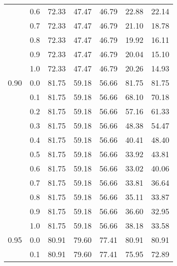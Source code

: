 \begin{longtable}{lp{2cm}|p{2cm}p{2cm}p{2cm}p{2cm}p{2cm}}
     & 0.6 &       72.33 &             47.47 &                46.79 &                22.88 &           22.14 \\
     & 0.7 &       72.33 &             47.47 &                46.79 &                21.10 &           18.78 \\
     & 0.8 &       72.33 &             47.47 &                46.79 &                19.92 &           16.11 \\
     & 0.9 &       72.33 &             47.47 &                46.79 &                20.04 &           15.10 \\
     & 1.0 &       72.33 &             47.47 &                46.79 &                20.26 &           14.93 \\
0.90 & 0.0 &       81.75 &             59.18 &                56.66 &                81.75 &           81.75 \\
     & 0.1 &       81.75 &             59.18 &                56.66 &                68.10 &           70.18 \\
     & 0.2 &       81.75 &             59.18 &                56.66 &                57.16 &           61.33 \\
     & 0.3 &       81.75 &             59.18 &                56.66 &                48.38 &           54.47 \\
     & 0.4 &       81.75 &             59.18 &                56.66 &                40.41 &           48.40 \\
     & 0.5 &       81.75 &             59.18 &                56.66 &                33.92 &           43.81 \\
     & 0.6 &       81.75 &             59.18 &                56.66 &                33.02 &           40.06 \\
     & 0.7 &       81.75 &             59.18 &                56.66 &                33.81 &           36.64 \\
     & 0.8 &       81.75 &             59.18 &                56.66 &                35.11 &           33.87 \\
     & 0.9 &       81.75 &             59.18 &                56.66 &                36.60 &           32.95 \\
     & 1.0 &       81.75 &             59.18 &                56.66 &                38.18 &           33.58 \\
0.95 & 0.0 &       80.91 &             79.60 &                77.41 &                80.91 &           80.91 \\
     & 0.1 &       80.91 &             79.60 &                77.41 &                75.95 &           72.89 \\

\end{longtable}
